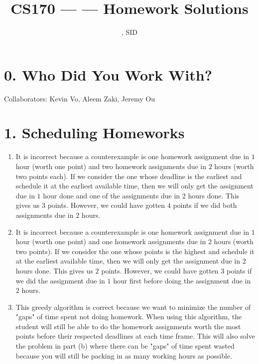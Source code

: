 \documentclass[11pt]{article}
\title{CS170 --- \Session --- Homework \Homework \space Solutions}
\author{\Name, SID \SID}
\date{}
\begin{document}
\maketitle

\section*{0. Who Did You Work With?}

Collaborators: Kevin Vo, Aleem Zaki, Jeremy Ou



\newpage
\section*{1. Scheduling Homeworks}
\begin{enumerate}[label=(\alph*)]
\item
It is incorrect because a counterexample is one homework assignment due in $1$ hour (worth one point) and two homework assignments due in $2$ hours (worth two points each). If we consider the one whose deadline is the earliest and schedule it at the earliest available time, then we will only get the assignment due in $1$ hour done and one of the assignments due in $2$ hours done. This gives us $3$ points. However, we could have gotten $4$ points if we did both assignments due in $2$ hours.

\item
It is incorrect because a counterexample is one homework assignment due in $1$ hour (worth one point) and one homework assignments due in $2$ hours (worth two points). If we consider the one whose points is the highest and schedule it at the earliest available time, then we will only get the assignment due in $2$ hours done. This gives us $2$ points. However, we could have gotten $3$ points if we did the assignment due in $1$ hour first before doing the assignment due in $2$ hours.

\item
This greedy algorithm is correct because we want to minimize the number of "gaps"
of time spent not doing homework. When using this algorithm, the student will still be able to do the homework assignments worth the most points before their respected deadlines at each time frame. This will also solve the problem in part (b) where there can be "gaps" of time spent wasted because you will still be packing in as many working hours as possible.

\end{enumerate}
\end{document}
